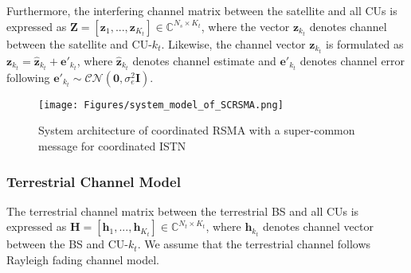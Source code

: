 \documentclass[draftclsnofoot, onecolumn, comsoc, 12pt]{IEEEtran}
\begin{document}
Furthermore, the interfering channel matrix between the satellite and all CUs is expressed as $\mathbf{Z}=[\mathbf{z}_{1},...,\mathbf{z}_{K_{t}}] \in \mathbb{C}^{N_{s}\times K_{t}}$, where the vector $\mathbf{z}_{k_{t}}$ denotes channel between the satellite and CU-$k_{t}$. Likewise, the channel vector $\mathbf{z}_{k_{t}}$ is formulated as $\mathbf{z}_{k_{t}} = \hat{\mathbf{z}}_{k_{t}} + {\mathbf{e}}'_{k_{t}}$, where $\hat{\mathbf{z}}_{k_{t}}$ denotes channel estimate and ${\mathbf{e}}'_{k_{t}}$ denotes channel error following ${\mathbf{e}}'_{k_{t}} \sim \mathcal{CN}(\mathbf{0},{\sigma}_{e}^{2}\mathbf{I})$.

\begin{figure}[t]
    \centering
    \texttt{[image: Figures/system\_model\_of\_SCRSMA.png]}
    \caption{System architecture of coordinated RSMA with a super-common message for coordinated ISTN}
    \label{fig:System Architecture}
\end{figure}

\subsubsection{Terrestrial Channel Model}
The terrestrial channel matrix between the terrestrial BS and all CUs is expressed as $\mathbf{H}=[\mathbf{h}_{1},...,\mathbf{h}_{K_{t}}] \in \mathbb{C}^{N_{t}\times K_{t}}$, where $\mathbf{h}_{k_{t}}$ denotes channel vector between the BS and CU-$k_{t}$. We assume that the terrestrial channel follows Rayleigh fading channel model.
\end{document}
